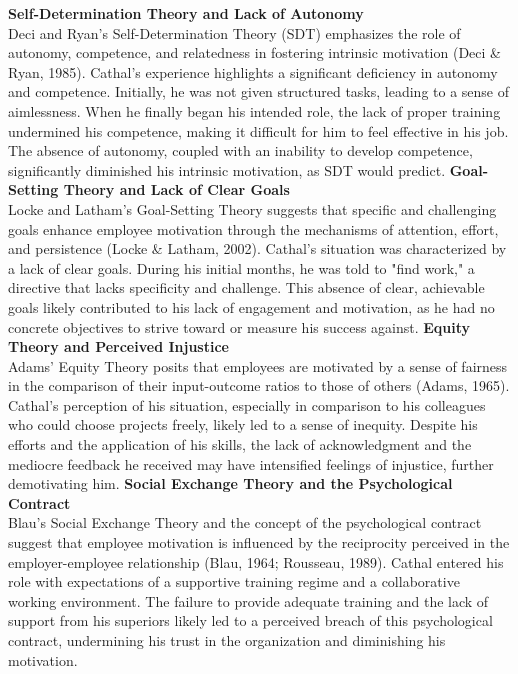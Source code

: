 \documentclass[12pt]{article}
\begin{document}
\begin{flushleft}
\bigbreak \noindent 
\textbf{Self-Determination Theory and Lack of Autonomy} \\
Deci and Ryan's Self-Determination Theory (SDT) emphasizes the role of autonomy, competence, and relatedness in fostering intrinsic motivation (Deci & Ryan, 1985). Cathal's experience highlights a significant deficiency in autonomy and competence. Initially, he was not given structured tasks, leading to a sense of aimlessness. When he finally began his intended role, the lack of proper training undermined his competence, making it difficult for him to feel effective in his job. The absence of autonomy, coupled with an inability to develop competence, significantly diminished his intrinsic motivation, as SDT would predict.
\bigbreak \noindent 
\textbf{Goal-Setting Theory and Lack of Clear Goals} \\
Locke and Latham's Goal-Setting Theory suggests that specific and challenging goals enhance employee motivation through the mechanisms of attention, effort, and persistence (Locke & Latham, 2002). Cathal's situation was characterized by a lack of clear goals. During his initial months, he was told to "find work," a directive that lacks specificity and challenge. This absence of clear, achievable goals likely contributed to his lack of engagement and motivation, as he had no concrete objectives to strive toward or measure his success against.
\bigbreak \noindent 
\textbf{Equity Theory and Perceived Injustice} \\
Adams' Equity Theory posits that employees are motivated by a sense of fairness in the comparison of their input-outcome ratios to those of others (Adams, 1965). Cathal's perception of his situation, especially in comparison to his colleagues who could choose projects freely, likely led to a sense of inequity. Despite his efforts and the application of his skills, the lack of acknowledgment and the mediocre feedback he received may have intensified feelings of injustice, further demotivating him.
\bigbreak \noindent 
\textbf{Social Exchange Theory and the Psychological Contract} \\
Blau's Social Exchange Theory and the concept of the psychological contract suggest that employee motivation is influenced by the reciprocity perceived in the employer-employee relationship (Blau, 1964; Rousseau, 1989). Cathal entered his role with expectations of a supportive training regime and a collaborative working environment. The failure to provide adequate training and the lack of support from his superiors likely led to a perceived breach of this psychological contract, undermining his trust in the organization and diminishing his motivation.

\end{flushleft}
\end{document}
